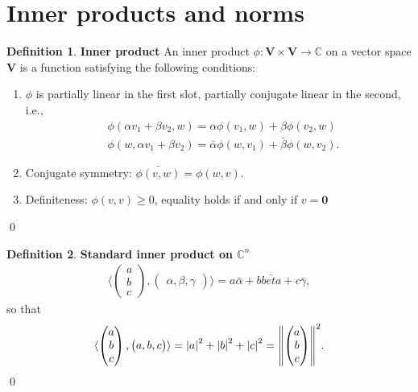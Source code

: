 \documentclass{article}
\theoremstyle{definition}
\newtheorem{defn}{Definition}[section]
\newcommand{\C}{\mathbb{C}}
\newcommand{\V}{\mathbf{V}}
\newcommand{\la}{\langle}
\newcommand{\ra}{\rangle}
\begin{document}
\newpage

\section{Inner products and norms} 



\begin{defn}\textbf{Inner product}
	An inner product $\phi: \V \times \V \to \C$ on a vector space $\V$ is a function satisfying the following conditions:
	\begin{enumerate}
		\item $\phi$ is partially linear in the first slot, partially conjugate linear in the second, i.e.,
		\begin{align*}
		&\phi(\alpha v_1 + \beta v_2, w) = \alpha \phi(v_1, w) + \beta\phi(v_2,w)\\
		&\phi(w,\alpha v_1 + \beta v_2) = \bar{\alpha}\phi(w,v_1)+ \bar{\beta}\phi(w,v_2).
		\end{align*} 
		\item Conjugate symmetry: $\bar{\phi(v,w)} = \phi(w,v)$.
		\item Definiteness: $\phi(v,v) \geq 0$, equality holds if and only if $v = \mathbf{0}$
	\end{enumerate}\qed
\end{defn}



\begin{defn}\textbf{Standard inner product on $\C^n$}
	\begin{align*}
	\la \begin{pmatrix}
	a\\b\\c
	\end{pmatrix}, \begin{pmatrix}
	\alpha,\beta,\gamma
	\end{pmatrix} \ra = a\bar{\alpha} + b\bar{beta} + c\bar{\gamma},
	\end{align*}
	so that 
	\begin{align*}
	\la \begin{pmatrix}
	a\\b\\c
	\end{pmatrix}, \begin{pmatrix}
	a,b,c
	\end{pmatrix} \ra = \abs{a}^2 + \abs{b}^2 + \abs{c}^2 = \norm{\begin{pmatrix}
		a\\b\\c
		\end{pmatrix}}^2.
	\end{align*}
	\qed
\end{defn}
\end{document}
